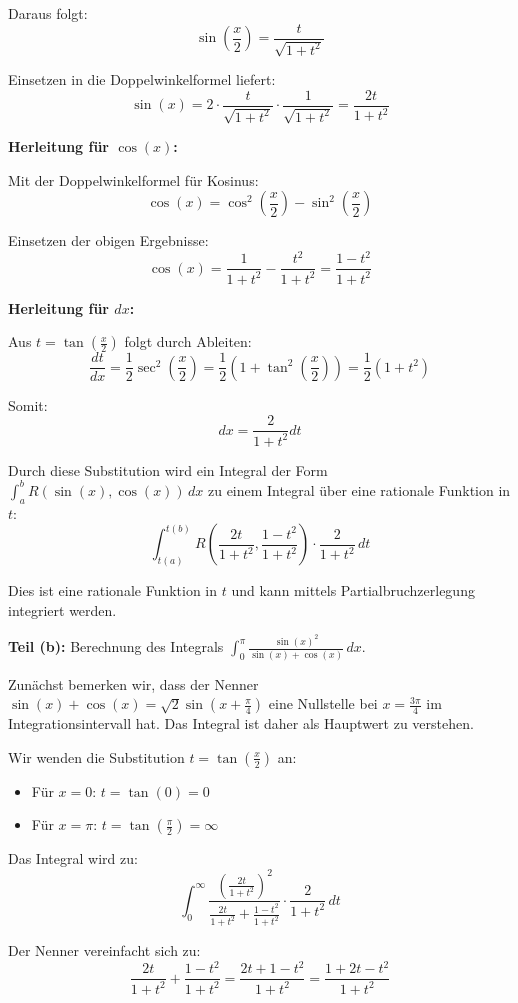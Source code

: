 \documentclass{article}
\begin{document}
Daraus folgt:
$$\sin\left(\frac{x}{2}\right) = \frac{t}{\sqrt{1+t^2}}$$

Einsetzen in die Doppelwinkelformel liefert:
$$\sin(x) = 2 \cdot \frac{t}{\sqrt{1+t^2}} \cdot \frac{1}{\sqrt{1+t^2}} = \frac{2t}{1+t^2}$$

\textbf{Herleitung für $\cos(x)$:}

Mit der Doppelwinkelformel für Kosinus:
$$\cos(x) = \cos^2\left(\frac{x}{2}\right) - \sin^2\left(\frac{x}{2}\right)$$

Einsetzen der obigen Ergebnisse:
$$\cos(x) = \frac{1}{1+t^2} - \frac{t^2}{1+t^2} = \frac{1-t^2}{1+t^2}$$

\textbf{Herleitung für $dx$:}

Aus $t = \tan(\frac{x}{2})$ folgt durch Ableiten:
$$\frac{dt}{dx} = \frac{1}{2}\sec^2\left(\frac{x}{2}\right) = \frac{1}{2}\left(1 + \tan^2\left(\frac{x}{2}\right)\right) = \frac{1}{2}(1 + t^2)$$

Somit:
$$dx = \frac{2}{1+t^2}dt$$

Durch diese Substitution wird ein Integral der Form $\int_a^b R(\sin(x),\cos(x))\,dx$ zu einem Integral über eine rationale Funktion in $t$:
$$\int_{t(a)}^{t(b)} R\left(\frac{2t}{1+t^2}, \frac{1-t^2}{1+t^2}\right) \cdot \frac{2}{1+t^2}\,dt$$

Dies ist eine rationale Funktion in $t$ und kann mittels Partialbruchzerlegung integriert werden.

\textbf{Teil (b):} Berechnung des Integrals $\int_0^\pi \frac{\sin(x)^2}{\sin(x)+\cos(x)}\,dx$.

Zunächst bemerken wir, dass der Nenner $\sin(x) + \cos(x) = \sqrt{2}\sin(x + \frac{\pi}{4})$ eine Nullstelle bei $x = \frac{3\pi}{4}$ im Integrationsintervall hat. Das Integral ist daher als Hauptwert zu verstehen.

Wir wenden die Substitution $t = \tan(\frac{x}{2})$ an:
\begin{itemize}
\item Für $x = 0$: $t = \tan(0) = 0$
\item Für $x = \pi$: $t = \tan(\frac{\pi}{2}) = \infty$
\end{itemize}

Das Integral wird zu:
$$\int_0^\infty \frac{\left(\frac{2t}{1+t^2}\right)^2}{\frac{2t}{1+t^2} + \frac{1-t^2}{1+t^2}} \cdot \frac{2}{1+t^2}\,dt$$

Der Nenner vereinfacht sich zu:
$$\frac{2t}{1+t^2} + \frac{1-t^2}{1+t^2} = \frac{2t + 1 - t^2}{1+t^2} = \frac{1 + 2t - t^2}{1+t^2}$$
\end{document}

